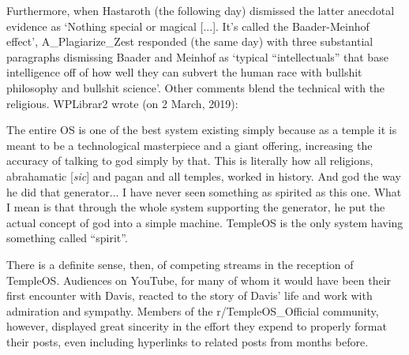 \documentclass[Draft.tex]{subfiles}
\begin{document}
Furthermore, when Hastaroth (the following day) dismissed
the latter anecdotal evidence as `Nothing special or magical [...].
It's called the Baader-Meinhof effect', A\_Plagiarize\_Zest responded
(the same day) with three substantial paragraphs dismissing Baader and Meinhof
as `typical ``intellectuals'' that base intelligence off of
how well they can subvert the human race
with bullshit philosophy and bullshit science'.
Other comments blend the technical with the religious.
WPLibrar2 wrote (on 2 March, 2019):
\begin{displayquote}
	The entire OS is one of the best system existing simply because
	as a temple it is meant to be a technological masterpiece
	and a giant offering, increasing the accuracy
	of talking to god simply by that.
	This is literally how all religions, abrahamatic [\textit{sic}] and pagan
	and all temples, worked in history.
	And god the way he did that generator...
	I have never seen something as spirited as this one.
	What I mean is that through the whole system supporting the generator,
	he put the actual concept of god into a simple machine.
	TempleOS is the only system having something called ``spirit''.
\end{displayquote}

There is a definite sense, then, of competing streams in the reception
of TempleOS.
Audiences on YouTube, for many of whom it would have been their first
encounter with Davis, reacted to the story of Davis' life and work
with admiration and sympathy.
Members of the r/TempleOS\_Official community, however, displayed
great sincerity in the effort they expend to properly format their posts,
even including hyperlinks to related posts from months before.

\end{document}
